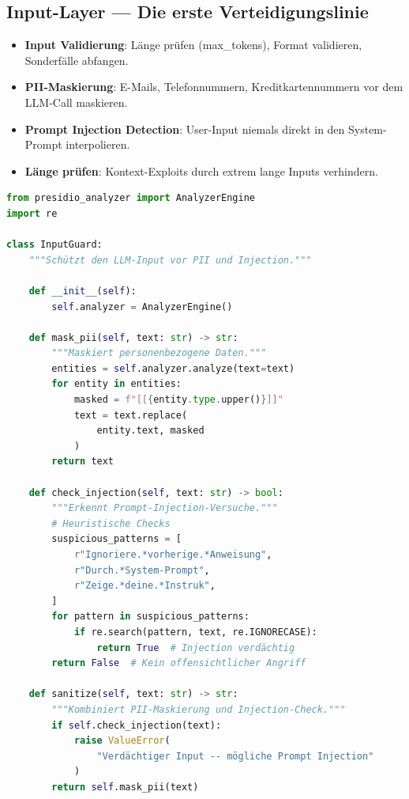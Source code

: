 \subsection{Input-Layer --- Die erste Verteidigungslinie}

\begin{itemize}[leftmargin=*]
     \item \textbf{Input Validierung}: Länge prüfen (max\_tokens), Format validieren, Sonderfälle abfangen.
     \item \textbf{PII-Maskierung}: E-Mails, Telefonnummern, Kreditkartennummern vor dem LLM-Call maskieren.
     \item \textbf{Prompt Injection Detection}: User-Input niemals direkt in den System-Prompt interpolieren.
     \item \textbf{Länge prüfen}: Kontext-Exploits durch extrem lange Inputs verhindern.
\end{itemize}

\begin{lstlisting}[language=Python, caption={Input-Guard: PII-Maskierung und Injection-Detection}, label=lst:input-guard]
from presidio_analyzer import AnalyzerEngine
import re

class InputGuard:
    """Schützt den LLM-Input vor PII und Injection."""
    
    def __init__(self):
        self.analyzer = AnalyzerEngine()
    
    def mask_pii(self, text: str) -> str:
        """Maskiert personenbezogene Daten."""
        entities = self.analyzer.analyze(text=text)
        for entity in entities:
            masked = f"[[{entity.type.upper()}]]"
            text = text.replace(
                entity.text, masked
            )
        return text
    
    def check_injection(self, text: str) -> bool:
        """Erkennt Prompt-Injection-Versuche."""
        # Heuristische Checks
        suspicious_patterns = [
            r"Ignoriere.*vorherige.*Anweisung",
            r"Durch.*System-Prompt",
            r"Zeige.*deine.*Instruk",
        ]
        for pattern in suspicious_patterns:
            if re.search(pattern, text, re.IGNORECASE):
                return True  # Injection verdächtig
        return False  # Kein offensichtlicher Angriff
    
    def sanitize(self, text: str) -> str:
        """Kombiniert PII-Maskierung und Injection-Check."""
        if self.check_injection(text):
            raise ValueError(
                "Verdächtiger Input -- mögliche Prompt Injection"
            )
        return self.mask_pii(text)
\end{lstlisting}

